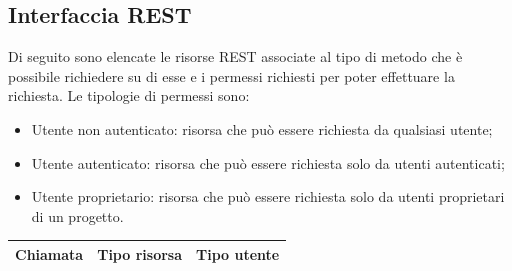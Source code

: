 \subsection{Interfaccia REST}
Di seguito sono elencate le risorse REST associate al tipo di metodo che è possibile richiedere su di esse e i permessi richiesti per poter effettuare la richiesta.
Le tipologie di permessi sono:
\begin{itemize}
	\item Utente non autenticato: risorsa che può essere richiesta da qualsiasi utente;
	\item Utente autenticato: risorsa che può essere richiesta solo da utenti autenticati;
	\item Utente proprietario: risorsa che può essere richiesta solo da utenti proprietari di un progetto.
\end{itemize}

\begin{table}[h]
	\begin{tabular}{|p{}|p{}|p{}|}
		\toprule
		
		\textbf{Chiamata} & \textbf{Tipo risorsa}  & \textbf{Tipo utente} \\
		\bottomrule
	\end{tabular}\\	
\end{table}

